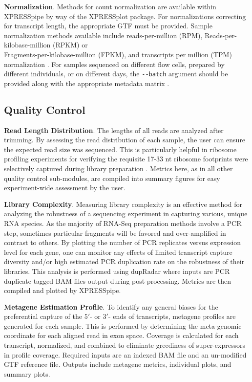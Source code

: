 \documentclass[10pt, oneside]{article}
\begin{document}
\noindent\textbf{Normalization}. Methods for count normalization are available within XPRESSpipe by way of the XPRESSplot package. For normalizations correcting for transcript length, the appropriate GTF must be provided. Sample normalization methods available include reads-per-million (RPM), Reads-per-kilobase-million (RPKM) or \\Fragments-per-kilobase-million (FPKM), and transcripts per million (TPM) normalization \cite{evans_briefbio}. For samples sequenced on different flow cells, prepared by different individuals, or on different days, the \texttt{-{}-batch} argument should be provided along with the appropriate metadata matrix \cite{sva}. \\

\subsection*{Quality Control}
\textbf{Read Length Distribution}. The lengths of all reads are analyzed after trimming. By assessing the read distribution of each sample, the user can ensure the expected read size was sequenced. This is particularly helpful in ribosome profiling experiments for verifying the requisite 17-33 nt ribosome footprints were selectively captured during library preparation \cite{ingolia_meth, fp_range}. Metrics here, as in all other quality control sub-modules, are compiled into summary figures for easy experiment-wide assessment by the user. \par

\noindent\textbf{Library Complexity}. Measuring library complexity is an effective method for analyzing the robustness of a sequencing experiment in capturing various, unique RNA species. As the majority of RNA-Seq preparation methods involve a PCR step, sometimes particular fragments will be favored and over-amplified in contrast to others. By plotting the number of PCR replicates versus expression level for each gene, one can monitor any effects of limited transcript capture diversity and/or high estimated PCR duplication rate on the robustness of their libraries. This analysis is performed using dupRadar \cite{dupradar} where inputs are PCR duplicate-tagged BAM files output during post-processing. Metrics are then compiled and plotted by XPRESSpipe. \par

\noindent\textbf{Metagene Estimation Profile}. To identify any general biases for the preferential capture of the $5'$- or $3'$- ends of transcripts, metagene profiles are generated for each sample. This is performed by determining the meta-genomic coordinate for each aligned read in exon space. Coverage is calculated for each transcript, normalized, and combined to eliminate greediness of super-expressors in profile coverage. Required inputs are an indexed BAM file and an un-modified GTF reference file. Outputs include metagene metrics, individual plots, and summary plots. \par
\end{document}
